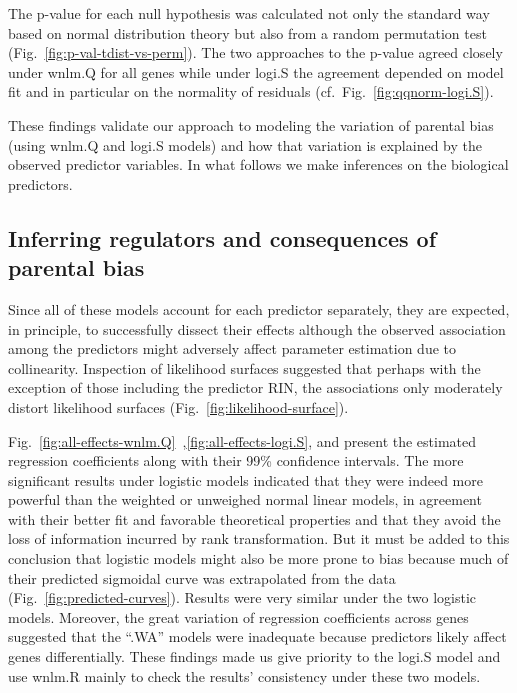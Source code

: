 \documentclass[letterpaper]{article}
\begin{document}
The p-value for each null hypothesis was
calculated not only the standard way based on normal distribution theory but
also from a random permutation test (Fig.~\ref{fig:p-val-tdist-vs-perm}).  The
two approaches to the p-value agreed closely under wnlm.Q for all genes while
under logi.S the agreement depended on model fit and in particular on the
normality of residuals (cf.~Fig.~\ref{fig:qqnorm-logi.S}).

These findings validate our approach to modeling the variation of parental bias
(using wnlm.Q and logi.S models) and how that variation is explained by
the observed predictor variables.  In what follows we make inferences on
the biological predictors.

\subsection{Inferring regulators and consequences of parental bias}

Since all of these models account for each predictor separately, they are
expected, in principle, to successfully dissect their effects although the
observed association among the predictors might adversely affect parameter
estimation due to collinearity.  Inspection of likelihood surfaces suggested
that perhaps with the exception of those including the predictor RIN, the
associations only moderately distort likelihood surfaces
(Fig.~\ref{fig:likelihood-surface}).

Fig.~\ref{fig:all-effects-wnlm.Q}~,\ref{fig:all-effects-logi.S},
and present the estimated regression coefficients
along with their 99\% confidence intervals.  The
more significant results under logistic models indicated that they were indeed
more powerful than the weighted or unweighed normal linear models, in
agreement with their better fit and favorable theoretical properties and that
they avoid the loss of information incurred by rank transformation.  But it
must be added to this conclusion that logistic models might also be more prone
to bias because much of their predicted sigmoidal curve was extrapolated from
the data (Fig.~\ref{fig:predicted-curves}).  Results were very similar under
the two logistic models.  Moreover, the great variation of regression
coefficients across genes suggested that the ``.WA'' models were inadequate
because predictors likely affect genes differentially.  These findings made us
give priority to the logi.S model and use wnlm.R mainly to check the results'
consistency under these two models.
\end{document}
